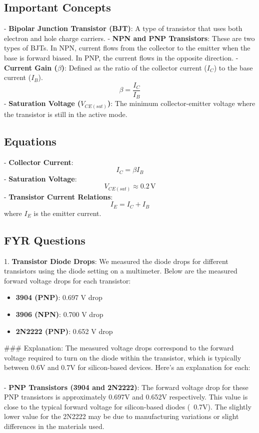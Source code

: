 \documentclass{article}
\begin{document}
\subsection*{Important Concepts}
- \textbf{Bipolar Junction Transistor (BJT)}: A type of transistor that uses both electron and hole charge carriers.
- \textbf{NPN and PNP Transistors}: These are two types of BJTs. In NPN, current flows from the collector to the emitter when the base is forward biased. In PNP, the current flows in the opposite direction.
- \textbf{Current Gain (\(\beta\))}: Defined as the ratio of the collector current (\(I_C\)) to the base current (\(I_B\)).
  \[
  \beta = \frac{I_C}{I_B}
  \]
- \textbf{Saturation Voltage (\(V_{CE(sat)}\))}: The minimum collector-emitter voltage where the transistor is still in the active mode.

\subsection*{Equations}
- \textbf{Collector Current}:
  \[
  I_C = \beta I_B
  \]
- \textbf{Saturation Voltage}:
  \[
  V_{CE(sat)} \approx 0.2 \, \text{V}
  \]
- \textbf{Transistor Current Relations}:
  \[
  I_E = I_C + I_B
  \]
  where \(I_E\) is the emitter current.
  
\subsection*{FYR Questions}

1. \textbf{Transistor Diode Drops}:
We measured the diode drops for different transistors using the diode setting on a multimeter. Below are the measured forward voltage drops for each transistor:

\begin{itemize}
    \item \textbf{3904 (PNP)}: 0.697 V drop
    \item \textbf{3906 (NPN)}: 0.700 V drop
    \item \textbf{2N2222 (PNP)}: 0.652 V drop
\end{itemize}

### Explanation:
The measured voltage drops correspond to the forward voltage required to turn on the diode within the transistor, which is typically between 0.6V and 0.7V for silicon-based devices. Here's an explanation for each:
\\ \\

- \textbf{PNP Transistors (3904 and 2N2222)}: The forward voltage drop for these PNP transistors is approximately 0.697V and 0.652V respectively. This value is close to the typical forward voltage for silicon-based diodes (~0.7V). The slightly lower value for the 2N2222 may be due to manufacturing variations or slight differences in the materials used.
  
\end{document}
